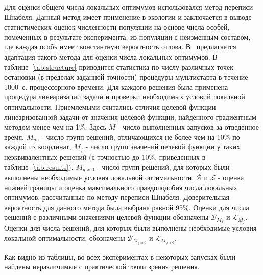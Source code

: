 Для оценки общего числа локальных оптимумов использовался метод переписи Шнабеля. Данный метод имеет применение в экологии и заключается в
выводе статистических оценок численности популяции на основе числа особей, помеченных в результате эксперимента, из популяции с неизменным
составом, где каждая особь имеет константную вероятность отлова. В~\autocite{eremeev:confidence} предлагается адаптация такого метода для оценки числа локальных оптимумов. В таблице~\ref{tab:structure} приводится статистика по числу различных точек остановки (в пределах заданной точности) процедуры мультистарта в течение 1000~с. процессорного времени. Для каждого решения была применена процедура линеаризации задачи и проверки необходимых условий локальной оптимальности. Приемлемыми считались отличия целевой функции линеаризованной задачи от значения целевой функции, найденного градиентным методом менее чем на 1\%. Здесь {$M$} - число выполненных запусков за отведенное время, $M_{ne}$ - число групп решений, отличающихся не более чем на 10\% по каждой из координат, {$M_{f}$} - число групп значений целевой функции у таких неэквивалентных решений (с точностью до 10\%, приведенных в таблице~\ref{tab:results}). {$M_{y\approx0}$} - число групп решений, для которых были выполнены необходимые условия локальной оптимальности. $\mathcal{B}$ и $\mathcal{L}$ - оценка нижней границы и оценка максимального правдоподобия числа локальных оптимумов, рассчитанные по методу переписи Шнабеля. Доверительная вероятность для данного метода была выбрана равной 95\%. Оценки для числа решений с различными значениями целевой функции обозначены $\mathcal{B}_{M_f}$ и $\mathcal{L}_{M_f}$. Оценки для числа решений, для которых были выполнены необходимые условия локальной оптимальности, обозначены $\mathcal{B}_{M_{y\approx0}}$ и $\mathcal{L}_{M_{y\approx0}}$.

Как видно из таблицы, во всех экспериментах в некоторых запусках были найдены неразличимые с практической точки зрения решения.

